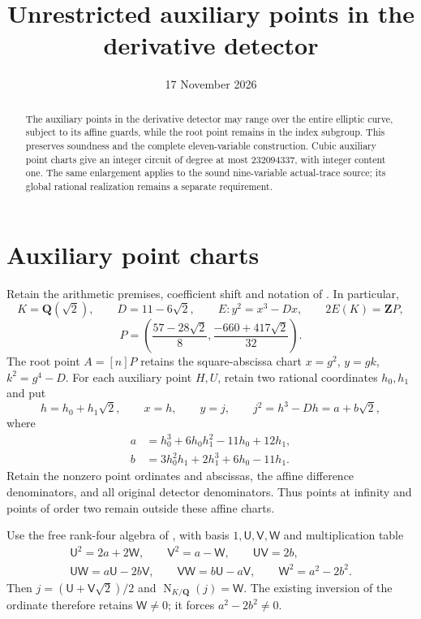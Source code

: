 \documentclass[11pt,a4paper]{article}
\title{Unrestricted auxiliary points in the derivative detector}
\author{}\date{17 November 2026}
\newcommand{\Q}{\mathbf Q}
\newcommand{\Z}{\mathbf Z}
\newcommand{\N}{\operatorname{N}}
\begin{document}
\maketitle
\begin{abstract}
The auxiliary points in the derivative detector may range over the
entire elliptic curve, subject to its affine guards, while the root
point remains in the index subgroup. This preserves soundness and
the complete eleven-variable construction. Cubic auxiliary point
charts give an integer circuit of degree at most $232094337$, with
integer content one. The same enlargement applies to the sound
nine-variable actual-trace source; its global rational realization
remains a separate requirement.
\end{abstract}

\section{Auxiliary point charts}
Retain the arithmetic premises, coefficient shift and notation of
\cite{Derivative,Criterion}. In particular,
\[
 K=\Q(\sqrt2),\qquad D=11-6\sqrt2,\qquad
 E:y^2=x^3-Dx,\qquad 2E(K)=\Z P,
\]
\[
 P=\left(\frac{57-28\sqrt2}{8},
          \frac{-660+417\sqrt2}{32}\right).
\]
The root point $A=[n]P$ retains the square-abscissa chart
$x=g^2$, $y=gk$, $k^2=g^4-D$. For each auxiliary point $H,U$,
retain two rational coordinates $h_0,h_1$ and put
\begin{equation}\label{eq:chart}
 h=h_0+h_1\sqrt2,\qquad x=h,\qquad y=j,\qquad
 j^2=h^3-Dh=a+b\sqrt2,
\end{equation}
where
\begin{align*}
 a&=h_0^3+6h_0h_1^2-11h_0+12h_1,\\
 b&=3h_0^2h_1+2h_1^3+6h_0-11h_1.
\end{align*}
Retain the nonzero point ordinates and abscissas, the affine
difference denominators, and all original detector denominators.
Thus points at infinity and points of order two remain outside
these affine charts.

Use the free rank-four algebra of \cite{Unit}, with basis
$1,\mathsf U,\mathsf V,\mathsf W$ and multiplication table
\[
\begin{gathered}
 \mathsf U^2=2a+2\mathsf W,\qquad
 \mathsf V^2=a-\mathsf W,\qquad \mathsf U\mathsf V=2b,\\
 \mathsf U\mathsf W=a\mathsf U-2b\mathsf V,\qquad
 \mathsf V\mathsf W=b\mathsf U-a\mathsf V,\qquad
 \mathsf W^2=a^2-2b^2.
\end{gathered}
\]
Then $j=(\mathsf U+\mathsf V\sqrt2)/2$ and
$\N_{K/\Q}(j)=\mathsf W$. The existing inversion of the ordinate
therefore retains $\mathsf W\ne0$; it forces $a^2-2b^2\ne0$.
\end{document}
